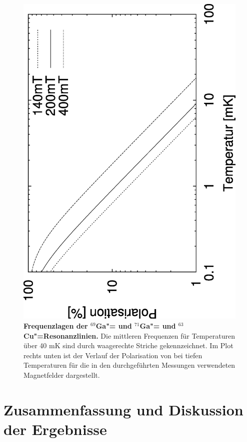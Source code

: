 \begin{figure}[htp]
\begin{center}
		\includegraphics[angle=-90,width=\ssmallwidth]{plots/pol_ga}
	\end{center}
	\caption[Frequenzlagen der $^{69}$Ga"= und $^{71}$Ga"= und
		$^{63}$Cu"=Resonanzlinien]{{\upshape\bfseries Frequenzlagen der $^{69}$Ga"= und $^{71}$Ga"= und
		$^{63}$Cu"=Resonanzlinien.} Die mittleren Frequenzen für Temperaturen über 40 mK sind durch
		waagerechte Striche gekennzeichnet. Im Plot rechts unten ist der Verlauf der Polarisation
		von \aug{} bei tiefen Temperaturen für die in den durchgeführten Messungen verwendeten
		Magnetfelder dargestellt.}
	\label{fig:frequenzshift}
 \end{figure}

\section{Zusammenfassung und Diskussion der Ergebnisse}

